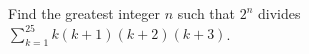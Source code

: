 Find the greatest integer $n$ such that $2^n$ divides $\displaystyle\sum_{k=1}^{25}k(k+1)(k+2)(k+3)$.
